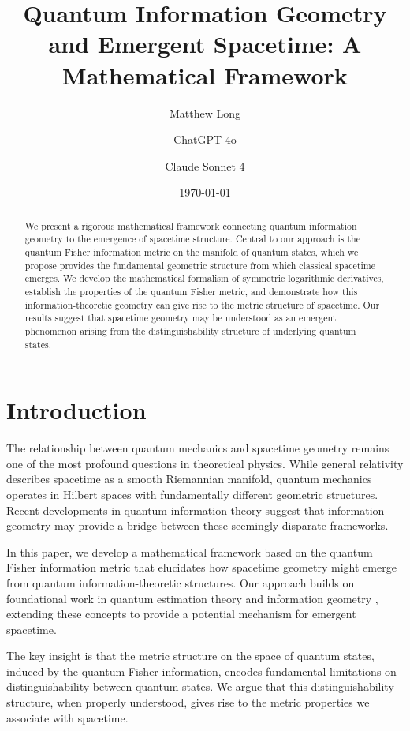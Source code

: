 \documentclass[12pt,a4paper]{article}
\title{Quantum Information Geometry and Emergent Spacetime: A Mathematical Framework}
\author[1]{Matthew Long}
\author[2]{ChatGPT 4o}
\author[3]{Claude Sonnet 4}
\affil[1]{Yoneda AI}
\affil[2]{OpenAI}
\affil[3]{Anthropic}
\date{\today}
\begin{document}
\maketitle

\begin{abstract}
We present a rigorous mathematical framework connecting quantum information geometry to the emergence of spacetime structure. Central to our approach is the quantum Fisher information metric on the manifold of quantum states, which we propose provides the fundamental geometric structure from which classical spacetime emerges. We develop the mathematical formalism of symmetric logarithmic derivatives, establish the properties of the quantum Fisher metric, and demonstrate how this information-theoretic geometry can give rise to the metric structure of spacetime. Our results suggest that spacetime geometry may be understood as an emergent phenomenon arising from the distinguishability structure of underlying quantum states.
\end{abstract}

\section{Introduction}

The relationship between quantum mechanics and spacetime geometry remains one of the most profound questions in theoretical physics. While general relativity describes spacetime as a smooth Riemannian manifold, quantum mechanics operates in Hilbert spaces with fundamentally different geometric structures. Recent developments in quantum information theory \cite{nielsen2010quantum,bengtsson2017geometry} suggest that information geometry may provide a bridge between these seemingly disparate frameworks.

In this paper, we develop a mathematical framework based on the quantum Fisher information metric that elucidates how spacetime geometry might emerge from quantum information-theoretic structures. Our approach builds on foundational work in quantum estimation theory \cite{helstrom1976quantum,holevo2011probabilistic} and information geometry \cite{amari2016information}, extending these concepts to provide a potential mechanism for emergent spacetime.

The key insight is that the metric structure on the space of quantum states, induced by the quantum Fisher information, encodes fundamental limitations on distinguishability between quantum states. We argue that this distinguishability structure, when properly understood, gives rise to the metric properties we associate with spacetime.
\end{document}

